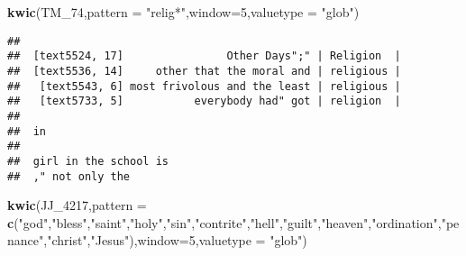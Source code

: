 \documentclass[]{article}
\newenvironment{Shaded}{\begin{snugshade}}{\end{snugshade}}
\newcommand{\KeywordTok}[1]{\textcolor[rgb]{0.13,0.29,0.53}{\textbf{#1}}}
\newcommand{\DataTypeTok}[1]{\textcolor[rgb]{0.13,0.29,0.53}{#1}}
\newcommand{\DecValTok}[1]{\textcolor[rgb]{0.00,0.00,0.81}{#1}}
\newcommand{\StringTok}[1]{\textcolor[rgb]{0.31,0.60,0.02}{#1}}
\newcommand{\NormalTok}[1]{#1}
\begin{document}
\begin{Shaded}
\begin{Highlighting}[]
\KeywordTok{kwic}\NormalTok{(TM_}\DecValTok{74}\NormalTok{,}\DataTypeTok{pattern =} \StringTok{"relig*"}\NormalTok{,}\DataTypeTok{window=}\DecValTok{5}\NormalTok{,}\DataTypeTok{valuetype =} \StringTok{"glob"}\NormalTok{)}
\end{Highlighting}
\end{Shaded}

\begin{verbatim}
##                                                           
##  [text5524, 17]                Other Days";" | Religion  |
##  [text5536, 14]     other that the moral and | religious |
##   [text5543, 6] most frivolous and the least | religious |
##   [text5733, 5]           everybody had" got | religion  |
##                       
##  in                   
##                       
##  girl in the school is
##  ," not only the
\end{verbatim}

\begin{Shaded}
\begin{Highlighting}[]
\KeywordTok{kwic}\NormalTok{(JJ_}\DecValTok{4217}\NormalTok{,}\DataTypeTok{pattern =} \KeywordTok{c}\NormalTok{(}\StringTok{"god"}\NormalTok{,}\StringTok{"bless"}\NormalTok{,}\StringTok{"saint"}\NormalTok{,}\StringTok{"holy"}\NormalTok{,}\StringTok{"sin"}\NormalTok{,}\StringTok{"contrite"}\NormalTok{,}\StringTok{"hell"}\NormalTok{,}\StringTok{"guilt"}\NormalTok{,}\StringTok{"heaven"}\NormalTok{,}\StringTok{"ordination"}\NormalTok{,}\StringTok{"penance"}\NormalTok{,}\StringTok{"christ"}\NormalTok{,}\StringTok{"Jesus"}\NormalTok{),}\DataTypeTok{window=}\DecValTok{5}\NormalTok{,}\DataTypeTok{valuetype =} \StringTok{"glob"}\NormalTok{)}
\end{Highlighting}
\end{Shaded}
\end{document}
